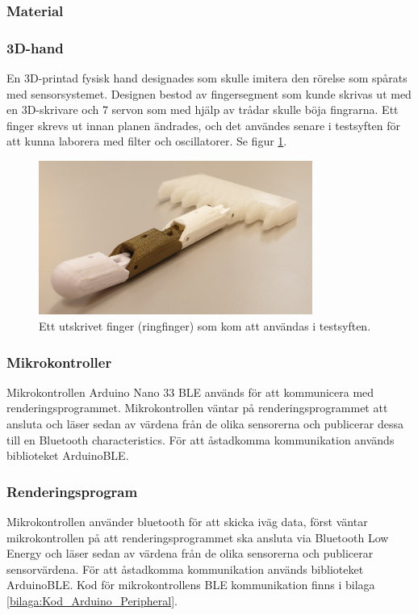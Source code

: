 \documentclass[a4paper]{article}
\begin{document}
\begin{sloppypar}
  \subsubsection{Material}

  \subsubsection{3D-hand}
  En 3D-printad fysisk hand designades som skulle imitera den rörelse som spårats med sensorsystemet.
  Designen bestod av fingersegment som kunde skrivas ut med en 3D-skrivare och 7 servon som med hjälp av trådar skulle böja fingrarna.
  Ett finger skrevs ut innan planen ändrades, och det användes senare i testsyften för att kunna laborera med filter och oscillatorer. Se figur \ref{fig:utskrivet-finger}.

  \begin{figure}[H]
    \centering
    \includegraphics[width=0.8\textwidth]{finger-printad.jpg}
    \caption{Ett utskrivet finger (ringfinger) som kom att användas i testsyften.}
    \label{fig:utskrivet-finger}
  \end{figure}

  \subsubsection{Mikrokontroller}
  Mikrokontrollen Arduino Nano 33 BLE används för att kommunicera med renderingsprogrammet.
  Mikrokontrollen väntar på renderingsprogrammet att ansluta och
  läser sedan av värdena från de olika sensorerna och publicerar dessa till en Bluetooth characteristics.
  För att åstadkomma kommunikation används biblioteket ArduinoBLE.

  \subsubsection{Renderingsprogram}
  Mikrokontrollen använder bluetooth för att skicka iväg data, först väntar mikrokontrollen på att renderingsprogrammet ska ansluta via Bluetooth Low Energy och
  läser sedan av värdena från de olika sensorerna och publicerar sensorvärdena.
  För att åstadkomma kommunikation används biblioteket ArduinoBLE. Kod för mikrokontrollens BLE kommunikation finns i bilaga \ref{bilaga:Kod_Arduino_Peripheral}.


\end{sloppypar}
\end{document}
